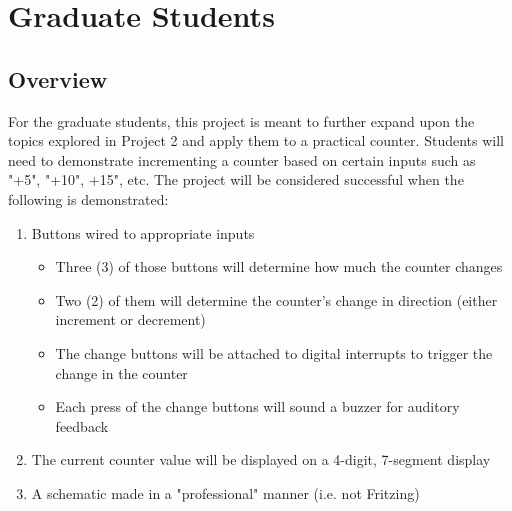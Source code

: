 \documentclass{article}
\begin{document}
\pagebreak
\section*{Graduate Students}
    \subsection*{Overview}
    For the graduate students, this project is meant to further expand upon the topics explored in Project 2 and apply them to a practical counter.
    Students will need to demonstrate incrementing a counter based on certain inputs such as "+5", "+10", +15", etc.
    The project will be considered successful when the following is demonstrated:
    
    \begin{enumerate}
        \item Buttons wired to appropriate inputs
            \begin{itemize}
                \item Three (3) of those buttons will determine how much the counter changes
                \item Two (2) of them will determine the counter's change in direction (either increment or decrement)
                \item The change buttons will be attached to digital interrupts to trigger the change in the counter
                \item Each press of the change buttons will sound a buzzer for auditory feedback
            \end{itemize}
        \item The current counter value will be displayed on a 4-digit, 7-segment display
        \item A schematic made in a "professional" manner (i.e. not Fritzing)
    \end{enumerate}
\end{document}
